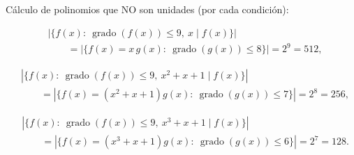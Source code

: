 \documentclass[a4paper,12pt]{article}
\begin{document}
\begin{ejercicio}[title=Ejercicio 10]
\vspace{0.5em}

Cálculo de polinomios que NO son unidades (por cada condición):

\[
\begin{aligned}
&\left|\{f(x):\ \operatorname{grado}(f(x))\le 9,\ x\mid f(x)\}\right|
\\[4pt]
&\qquad=\left|\{f(x)=x\,g(x):\ \operatorname{grado}(g(x))\le 8\}\right|
= 2^{9}=512,
\end{aligned}
\]

\[
\begin{aligned}
&\left|\{f(x):\ \operatorname{grado}(f(x))\le 9,\ x^2+x+1\mid f(x)\}\right|
\\[4pt]
&\qquad=\left|\{f(x)=(x^2+x+1)g(x):\ \operatorname{grado}(g(x))\le 7\}\right|
= 2^{8}=256,
\end{aligned}
\]

\[
\begin{aligned}
&\left|\{f(x):\ \operatorname{grado}(f(x))\le 9,\ x^3+x+1\mid f(x)\}\right|
\\[4pt]
&\qquad=\left|\{f(x)=(x^3+x+1)g(x):\ \operatorname{grado}(g(x))\le 6\}\right|
= 2^{7}=128.
\end{aligned}
\]


\end{ejercicio}
\end{document}
